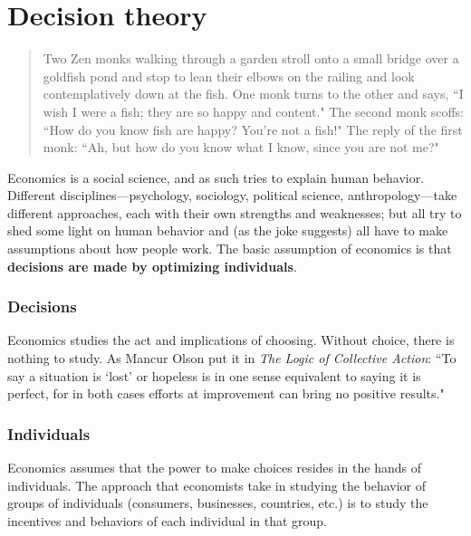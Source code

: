 
\chapter{Decision theory}      %
\label{1intro}

\begin{quote} Two Zen monks walking through a garden stroll onto a small bridge over a goldfish pond and stop to lean their elbows on the railing and look contemplatively down at the fish. One monk turns to the other and says, ``I wish I were a fish; they are so happy and content." The second monk scoffs: ``How do you know fish are happy? You're not a fish!" The reply of the first monk: ``Ah, but how do you know what I know, since you are not me?"
\end{quote}

\vspace*{.4cm}

\noindent Economics is a social science, and as such tries to explain human behavior. Different disciplines---psychology, sociology, political science, anthropology---take different approaches, each with their own strengths and weaknesses; but all try to shed some light on human behavior and (as the joke suggests) all have to make assumptions about how people work. The basic assumption of economics is that \textbf{decisions are made by optimizing individuals}.

\subsection*{Decisions}

Economics studies the act and implications of choosing. Without choice, there is nothing to study. As Mancur Olson put it in \emph{The Logic of Collective Action}: %
``To say a situation is `lost' or hopeless is in one sense equivalent to saying it is perfect, for in both cases efforts at improvement can bring no positive results."


\subsection*{Individuals}

Economics assumes that the power to make choices resides in the hands of individuals. The approach that economists take in studying the behavior of groups of individuals (consumers, businesses, countries, etc.) is to study the incentives and behaviors of each individual in that group.

